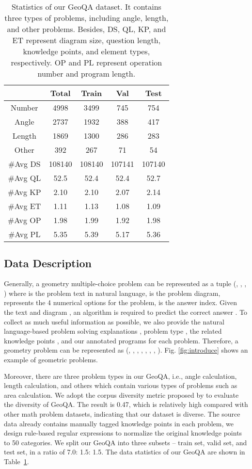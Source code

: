 \documentclass[11pt,a4paper]{article}
\begin{document}
\begin{table}[tbp]
\centering
\resizebox{1.0\linewidth}{!} {
\begin{tabular}{c|c|c|c|c}
\hline
& Total & Train & Val & Test \\
\hline
\hline
Number & 4998 & 3499 & 745 & 754 \\
\hline
Angle & 2737 & 1932 & 388 & 417\\
Length & 1869 & 1300 & 286 & 283\\
Other & 392 & 267 & 71 & 54\\
\hline
\#Avg DS & 108140 & 108140 & 107141 & 107140\\
\#Avg QL & 52.5 & 52.4 & 52.4 & 52.7\\
\#Avg KP & 2.10 & 2.10 & 2.07 & 2.14\\
\#Avg ET & 1.11 & 1.13 & 1.08 & 1.09\\
\hline
\#Avg OP & 1.98 & 1.99 & 1.92 & 1.98\\
\#Avg PL & 5.35 & 5.39 & 5.17 & 5.36\\
\hline
\end{tabular}
}
\caption{Statistics of our GeoQA dataset. It contains three types of problems, including angle, length, and other problems. Besides, DS, QL, KP, and ET represent diagram size, question length, knowledge points, and element types, respectively. OP and PL represent operation number and program length.
}
\label{table-dataset}
\end{table}

\subsection{Data Description}
 Generally, a geometry multiple-choice problem can be represented as a tuple (, , , ) where  is the problem text in natural language,  is the problem diagram,  represents the 4 numerical options for the problem,  is the answer index. Given the text  and diagram , an algorithm is required to predict the correct answer . To collect as much useful information as possible, we also provide the natural language-based problem solving explanations , problem type , the related knowledge points , and our annotated programs  for each problem. Therefore, a geometry problem can be represented as (, , , , , , , ). Fig. \ref{fig:introduce} shows an example of geometric problems.
 
 
Moreover, there are three problem types in our GeoQA, i.e., angle calculation, length calculation, and others which contain various types of problems such as area calculation. 
We adopt the corpus diversity metric proposed by \citet{miao2020diverse} to evaluate the diversity of GeoQA. The result is 0.47, which is relatively high compared with other math problem datasets, indicating that our dataset is diverse. 
The source data already contains manually tagged knowledge points in each problem, we design rule-based regular expressions to normalize the original knowledge points to 50 categories.
We split our GeoQA into three subsets -- train set, valid set, and test set, in a ratio of 7.0: 1.5: 1.5. 
The data statistics of our GeoQA are shown in Table~\ref{table-dataset}.
\end{document}
